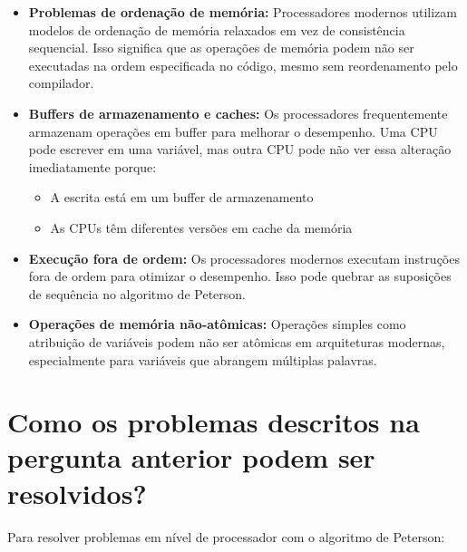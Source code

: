 \documentclass[12pt]{article}
\begin{document}
\begin{itemize}
    \item \textbf{Problemas de ordenação de memória:} Processadores modernos utilizam modelos de ordenação de memória relaxados em vez de consistência sequencial. Isso significa que as operações de memória podem não ser executadas na ordem especificada no código, mesmo sem reordenamento pelo compilador.

    \item \textbf{Buffers de armazenamento e caches:} Os processadores frequentemente armazenam operações em buffer para melhorar o desempenho. Uma CPU pode escrever em uma variável, mas outra CPU pode não ver essa alteração imediatamente porque:
    \begin{itemize}
        \item A escrita está em um buffer de armazenamento
        \item As CPUs têm diferentes versões em cache da memória
    \end{itemize}

    \item \textbf{Execução fora de ordem:} Os processadores modernos executam instruções fora de ordem para otimizar o desempenho. Isso pode quebrar as suposições de sequência no algoritmo de Peterson.

    \item \textbf{Operações de memória não-atômicas:} Operações simples como atribuição de variáveis podem não ser atômicas em arquiteturas modernas, especialmente para variáveis que abrangem múltiplas palavras.
\end{itemize}
\pagebreak
\section{Como os problemas descritos na pergunta anterior podem ser resolvidos?}

Para resolver problemas em nível de processador com o algoritmo de Peterson:
\end{document}
